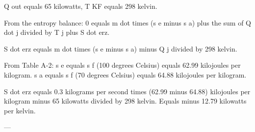 Q out equals 65 kilowatts, T KF equals 298 kelvin.  

From the entropy balance:  
0 equals m dot times (s e minus s a) plus the sum of Q dot j divided by T j plus S dot erz.  

S dot erz equals m dot times (s e minus s a) minus Q j divided by 298 kelvin.  

From Table A-2:  
s e equals s f (100 degrees Celsius) equals 62.99 kilojoules per kilogram.  
s a equals s f (70 degrees Celsius) equals 64.88 kilojoules per kilogram.  

S dot erz equals 0.3 kilograms per second times (62.99 minus 64.88) kilojoules per kilogram minus 65 kilowatts divided by 298 kelvin.  
Equals minus 12.79 kilowatts per kelvin.  

---